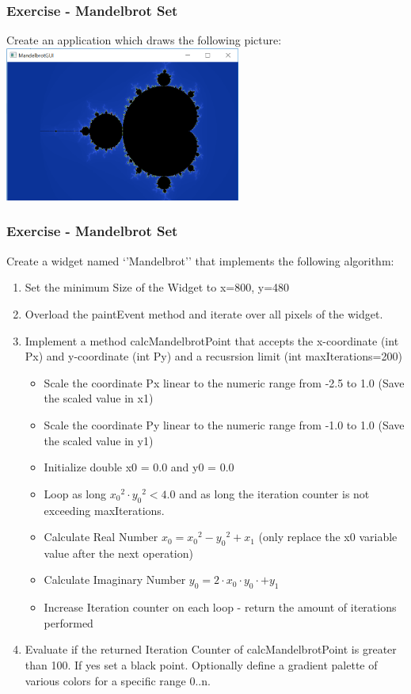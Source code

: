 \begin{frame}[fragile]
\frametitle{Exercise - Mandelbrot Set}
Create an application which draws the following picture:\\
\vspace{3mm}
\includegraphics[width=220pt]{img/Mandelbrot.png}
\end{frame}

\begin{frame}[fragile]
\frametitle{Exercise - Mandelbrot Set}
Create a widget named `'Mandelbrot'' that implements the following algorithm:
{\small
\begin{enumerate}
\item Set the minimum Size of the Widget to x=800, y=480
\item Overload the paintEvent method and iterate over all pixels of the widget. 
\item Implement a method calcMandelbrotPoint that accepts the x-coordinate (int Px) and y-coordinate (int Py) and a recusrsion limit (int maxIterations=200)
	\begin{itemize}
	\item Scale the coordinate Px linear to the numeric range from -2.5 to 1.0 (Save the scaled value in x1)
	\item Scale the coordinate Py linear to the numeric range from -1.0 to 1.0 (Save the scaled value in y1)
	\item Initialize double x0 = 0.0 and y0 = 0.0
	\item Loop as long ${x_0}^2 \cdot {y_0}^2 < 4.0$ and as long the iteration counter is not exceeding maxIterations.
	\item Calculate Real Number $x_0 = {x_0}^2 - {y_0}^2 + x_1$ (only replace the x0 variable value after the next operation)
	\item Calculate Imaginary Number $y_0 = 2 \cdot  x_0 \cdot y_0  \cdot + y_1$ 
	\item Increase Iteration counter on each loop - return the amount of iterations performed
	\end{itemize}
\item Evaluate if the returned Iteration Counter of calcMandelbrotPoint is greater than 100. If yes set a black point. Optionally define a gradient palette of various colors for a specific range 0..n.
\end{enumerate}
}
\end{frame}


